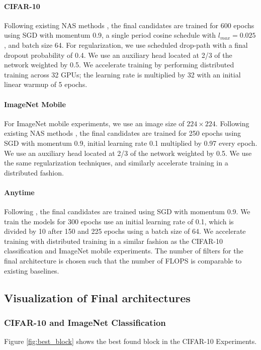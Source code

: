 \paragraph{CIFAR-10} Following existing NAS methods \citep{zoph2017learning,real2018regularized}, the final candidates are trained for 600 epochs  using  SGD with momentum 0.9,  a single period cosine schedule with $l_{max}=0.025$, and batch size 64. For regularization, we use scheduled drop-path with a final dropout probability of 0.4. We use an auxiliary head located at 2/3 of the network weighted by 0.5. We accelerate training by performing distributed training across 32 GPUs; the learning rate is multiplied by 32 with an initial linear warmup of 5 epochs. 

\paragraph{ImageNet Mobile} For ImageNet mobile experiments, we use an image size of $224\times224$. Following existing NAS methods \citep{zoph2017learning,real2018regularized}, the final candidates are trained for 250 epochs using SGD with momentum 0.9, initial learning rate 0.1 multiplied by 0.97 every epoch. We use an auxiliary head located at 2/3 of the network weighted by 0.5. We use the same regularization techniques, and similarly accelerate training in a distributed fashion. 

\paragraph{Anytime}Following \cite{huang2017multi}, the final candidates are trained using SGD with momentum 0.9. We train the models for 300 epochs use an initial learning rate of 0.1, which is divided by 10 after 150 and 225 epochs using a batch size of 64. We accelerate training with distributed training in a similar fashion as the CIFAR-10 classification and ImageNet mobile experiments. 
The number of filters for the final architecture is chosen such that the number of FLOPS is comparable to existing baselines.


\subsection{Visualization of Final architectures}
\subsubsection{CIFAR-10 and ImageNet Classification}
Figure \ref{fig:best_block} shows the best found block in the CIFAR-10 Experiments.

